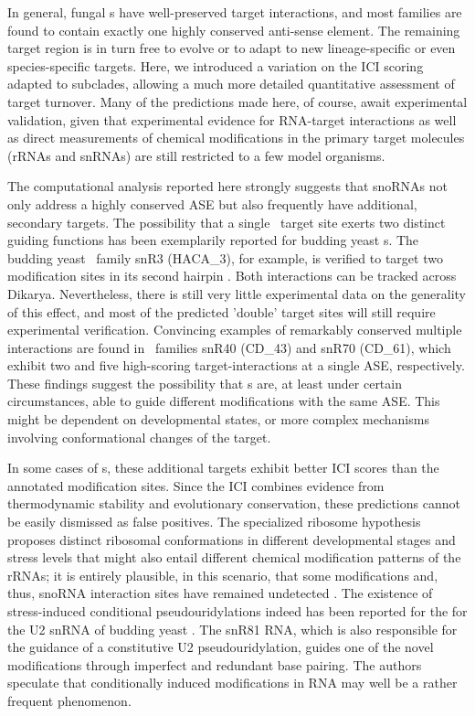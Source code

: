 In general, fungal \sno s have well-preserved target interactions, and
most families are found to contain exactly one highly conserved
anti-sense element. The remaining target region is in turn free to
evolve or to adapt to new lineage-specific or even species-specific
targets. Here, we introduced a variation on the ICI scoring adapted to
subclades, allowing a much more detailed quantitative assessment of
target turnover. Many of the predictions made here, of course, await
experimental validation, given that experimental evidence for
RNA-target interactions as well as direct measurements of chemical
modifications in the primary target molecules (rRNAs and snRNAs) are
still restricted to a few model organisms.

The computational analysis reported here strongly suggests that snoRNAs not
only address a highly conserved ASE but also frequently have additional,
secondary targets. The possibility that a single \sno\ target site exerts
two distinct guiding functions has been exemplarily reported for budding
yeast \haca s. The budding yeast \sno\ family snR3 (HACA\_3), for example,
is verified to target two modification sites in its second hairpin
\cite{Schattner:2004}.  Both interactions can be tracked across Dikarya.
Nevertheless, there is still very little experimental data on the
generality of this effect, and most of the predicted 'double' target sites
will still require experimental verification. Convincing examples of
remarkably conserved multiple interactions are found in \cd\ families snR40
(CD\_43) and snR70 (CD\_61), which exhibit two and five high-scoring
target-interactions at a single ASE, respectively.  These findings suggest
the possibility that \sno s are, at least under certain circumstances, able
to guide different modifications with the same ASE. This might be dependent
on developmental states, or more complex mechanisms involving
conformational changes of the target.

In some cases of \haca s, these additional targets exhibit better ICI
scores than the annotated modification sites. Since the ICI combines
evidence from thermodynamic stability and evolutionary conservation, these
predictions cannot be easily dismissed as false positives. The specialized
ribosome hypothesis proposes distinct ribosomal conformations in different
developmental stages and stress levels that might also entail different
chemical modification patterns of the rRNAs; it is entirely plausible, in
this scenario, that some modifications and, thus, snoRNA interaction sites
have remained undetected \citep{Xue:2012}. The existence of stress-induced
conditional pseudouridylations indeed has been reported for the for the U2
snRNA of budding yeast \cite{Wu:2011}. The snR81 RNA, which is also
responsible for the guidance of a constitutive U2 pseudouridylation, guides
one of the novel modifications through imperfect and redundant base
pairing. The authors speculate that conditionally induced modifications in
RNA may well be a rather frequent phenomenon.


